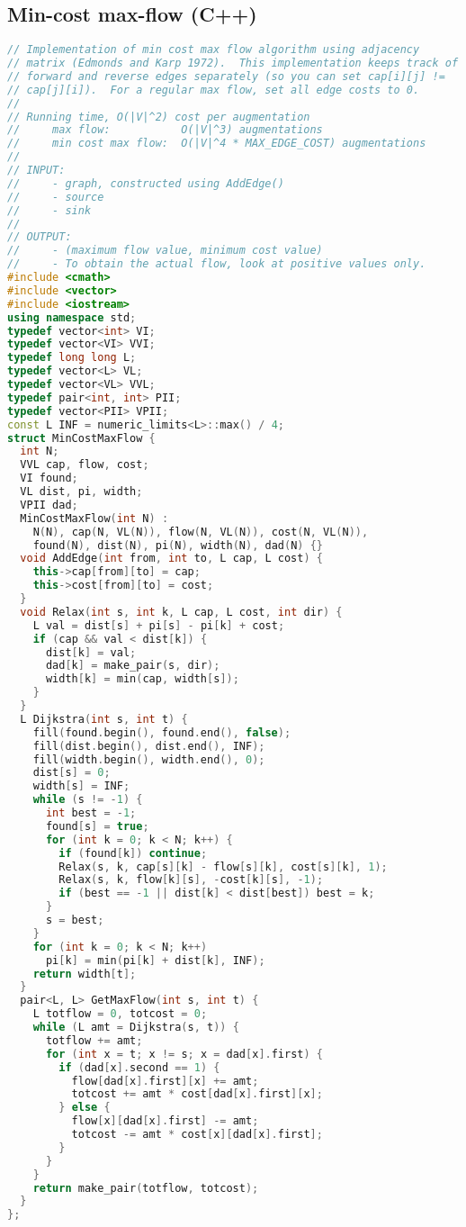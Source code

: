 \subsection{Min-cost max-flow (C++)}
\begin{lstlisting}[language=C++]
// Implementation of min cost max flow algorithm using adjacency
// matrix (Edmonds and Karp 1972).  This implementation keeps track of
// forward and reverse edges separately (so you can set cap[i][j] !=
// cap[j][i]).  For a regular max flow, set all edge costs to 0.
//
// Running time, O(|V|^2) cost per augmentation
//     max flow:           O(|V|^3) augmentations
//     min cost max flow:  O(|V|^4 * MAX_EDGE_COST) augmentations
//     
// INPUT: 
//     - graph, constructed using AddEdge()
//     - source
//     - sink
//
// OUTPUT:
//     - (maximum flow value, minimum cost value)
//     - To obtain the actual flow, look at positive values only.
#include <cmath>
#include <vector>
#include <iostream>
using namespace std;
typedef vector<int> VI;
typedef vector<VI> VVI;
typedef long long L;
typedef vector<L> VL;
typedef vector<VL> VVL;
typedef pair<int, int> PII;
typedef vector<PII> VPII;
const L INF = numeric_limits<L>::max() / 4;
struct MinCostMaxFlow {
  int N;
  VVL cap, flow, cost;
  VI found;
  VL dist, pi, width;
  VPII dad;
  MinCostMaxFlow(int N) : 
    N(N), cap(N, VL(N)), flow(N, VL(N)), cost(N, VL(N)), 
    found(N), dist(N), pi(N), width(N), dad(N) {}
  void AddEdge(int from, int to, L cap, L cost) {
    this->cap[from][to] = cap;
    this->cost[from][to] = cost;
  }
  void Relax(int s, int k, L cap, L cost, int dir) {
    L val = dist[s] + pi[s] - pi[k] + cost;
    if (cap && val < dist[k]) {
      dist[k] = val;
      dad[k] = make_pair(s, dir);
      width[k] = min(cap, width[s]);
    }
  }
  L Dijkstra(int s, int t) {
    fill(found.begin(), found.end(), false);
    fill(dist.begin(), dist.end(), INF);
    fill(width.begin(), width.end(), 0);
    dist[s] = 0;
    width[s] = INF;
    while (s != -1) {
      int best = -1;
      found[s] = true;
      for (int k = 0; k < N; k++) {
        if (found[k]) continue;
        Relax(s, k, cap[s][k] - flow[s][k], cost[s][k], 1);
        Relax(s, k, flow[k][s], -cost[k][s], -1);
        if (best == -1 || dist[k] < dist[best]) best = k;
      }
      s = best;
    }
    for (int k = 0; k < N; k++)
      pi[k] = min(pi[k] + dist[k], INF);
    return width[t];
  }
  pair<L, L> GetMaxFlow(int s, int t) {
    L totflow = 0, totcost = 0;
    while (L amt = Dijkstra(s, t)) {
      totflow += amt;
      for (int x = t; x != s; x = dad[x].first) {
        if (dad[x].second == 1) {
          flow[dad[x].first][x] += amt;
          totcost += amt * cost[dad[x].first][x];
        } else {
          flow[x][dad[x].first] -= amt;
          totcost -= amt * cost[x][dad[x].first];
        }
      }
    }
    return make_pair(totflow, totcost);
  }
};
\end{lstlisting}
